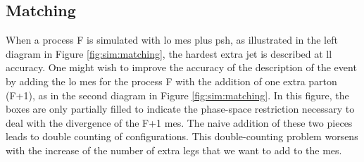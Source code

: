 \subsection{Matching}

When a process F is simulated with \gls{lo} \glspl{me} plus \gls{psh}, as illustrated in the left diagram in Figure \ref{fig:sim:matching}, 
the hardest extra jet is described at \gls{ll} accuracy. 
One might wish to improve the accuracy of the description of the event by adding the \gls{lo} \glspl{me} 
for the process F with the addition of one extra parton (F+1), as in the second diagram in Figure \ref{fig:sim:matching}. 
In this figure, the boxes are only partially filled to indicate the phase-space restriction 
necessary to deal with the divergence of the F+1 \glspl{me}. 
The naive addition of these two pieces leads to double counting of configurations. 
This double-counting problem worsens with the increase of the number of extra legs that we want to add to the \glspl{me}.

